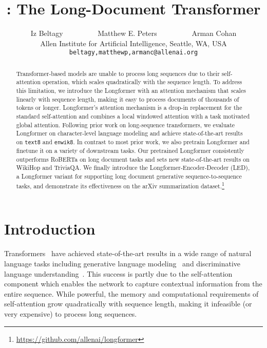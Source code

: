 \documentclass[11pt,a4paper]{article}
\title{\model: The Long-Document Transformer}
\author{
Iz Beltagy\Thanks{\enspace Equal contribution.}
~~~~~~~~~Matthew E. Peters\textcolor{darkblue}{\footnotemark[1]}
~~~~~~~~~Arman Cohan\textcolor{darkblue}{\footnotemark[1]}\\
Allen Institute for Artificial Intelligence, Seattle, WA, USA\\
{\tt beltagy,matthewp,armanc@allenai.org}\\}
\date{}
\newcommand{\model}{Longformer\xspace}
\begin{document}
\maketitle
\begin{abstract}
Transformer-based models are unable to process long sequences due to their self-attention operation, which scales quadratically with the sequence length.
To address this limitation, we introduce the \model with an attention mechanism that scales linearly with sequence length, making it easy to process documents of thousands of tokens or longer.
\model's attention mechanism is a drop-in replacement for the standard self-attention and combines a local windowed attention with a task motivated global attention.
Following prior work on long-sequence transformers, 
we evaluate \model on character-level language modeling
and achieve state-of-the-art results on \texttt{text8} and \texttt{enwik8}.
In contrast to most prior work,
we also pretrain \model
and finetune it on a variety of downstream tasks.
Our pretrained \model consistently outperforms RoBERTa on long document tasks
and sets new state-of-the-art results on WikiHop and
TriviaQA. We finally introduce the Longformer-Encoder-Decoder (LED), a Longformer variant for supporting long document generative sequence-to-sequence tasks, and demonstrate its effectiveness on the arXiv summarization dataset.\footnote{\url{https://github.com/allenai/longformer}}









\end{abstract}


\section{Introduction}





Transformers~\cite{Vaswani2017AttentionIA} have achieved state-of-the-art results in a wide range of natural language tasks including generative language modeling~\cite{transformerxl,gpt2} and discriminative language understanding~\cite{bert}. 
This success is partly due to the self-attention component which enables the network to capture contextual information from the entire sequence. While powerful, the memory and computational requirements of self-attention grow quadratically with sequence length, making it infeasible (or very expensive) to process long sequences.
\end{document}
